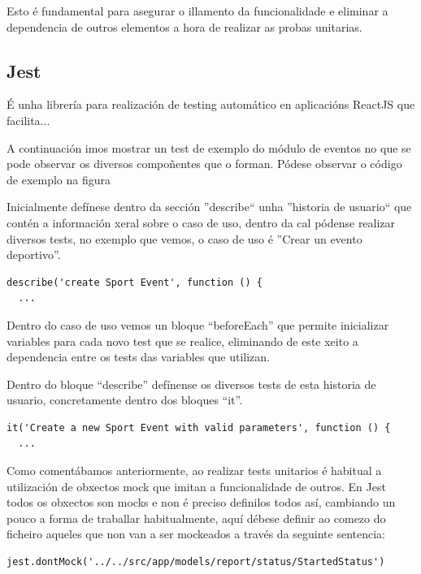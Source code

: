       Esto é fundamental para asegurar o illamento da funcionalidade e eliminar 
a dependencia de outros elementos a hora de realizar as probas unitarias.

    \subsection{Jest}
    É unha librería para realización de testing automático en aplicacións 
ReactJS que facilita...

    A continuación imos mostrar un test de exemplo do módulo de eventos no que 
se pode observar os diversos compoñentes que o forman. Pódese observar o código 
de exemplo na figura 

    Inicialmente defínese dentro da sección ''describe`` unha ''historia de 
usuario`` que contén a información xeral sobre o caso de uso, dentro da cal 
pódense realizar diversos tests, no exemplo que vemos, o caso de uso é ''Crear 
un evento deportivo''.

    \begin{lstlisting}[frame=single]
  describe('create Sport Event', function () {
  ...
    \end{lstlisting}

    Dentro do caso de uso vemos un bloque ``beforeEach'' que permite 
inicializar variables para cada novo test que se realice, eliminando de este 
xeito a dependencia entre os tests das variables que utilizan.

    Dentro do bloque ``describe'' defínense os diversos tests de esta historia 
de usuario, concretamente dentro dos bloques ``it''.

    \begin{lstlisting}[frame=single]
  it('Create a new Sport Event with valid parameters', function () {
  ...
    \end{lstlisting}

    Como comentábamos anteriormente, ao realizar tests unitarios é habitual a 
utilización de obxectos mock que imitan a funcionalidade de outros.
    En Jest todos os obxectos son mocks e non é preciso definilos todos así, 
cambiando un pouco a forma de traballar habitualmente, aquí débese definir ao 
comezo do ficheiro aqueles que non van a ser mockeados a través da 
seguinte sentencia:

    \begin{lstlisting}[frame=single]
     jest.dontMock('../../src/app/models/report/status/StartedStatus')
    \end{lstlisting}

